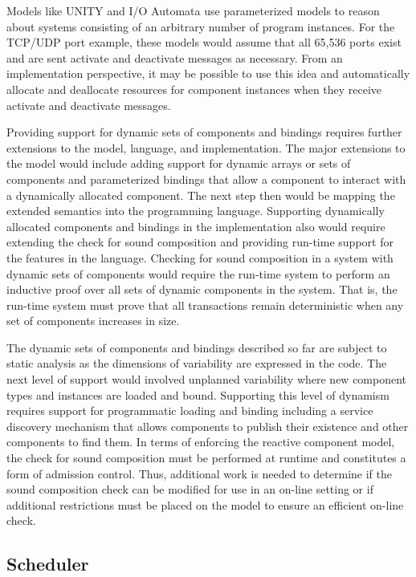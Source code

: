 Models like UNITY and I/O Automata use parameterized models to reason about systems consisting of an arbitrary number of program instances.
For the TCP/UDP port example, these models would assume that all 65,536 ports exist and are sent activate and deactivate messages as necessary.
From an implementation perspective, it may be possible to use this idea and automatically allocate and deallocate resources for component instances when they receive activate and deactivate messages.

Providing support for dynamic sets of components and bindings requires further extensions to the model, language, and implementation.
The major extensions to the model would include adding support for dynamic arrays or sets of components and parameterized bindings that allow a component to interact with a dynamically allocated component.
The next step then would be mapping the extended semantics into the \rcgo{} programming language.
Supporting dynamically allocated components and bindings in the implementation also would require extending the check for sound composition and providing run-time support for the features in the language.
Checking for sound composition in a system with dynamic sets of components would require the run-time system to perform an inductive proof over all sets of dynamic components in the system.
That is, the run-time system must prove that all transactions remain deterministic when any set of components increases in size.

The dynamic sets of components and bindings described so far are subject to static analysis as the dimensions of variability are expressed in the code.
The next level of support would involved unplanned variability where new component types and instances are loaded and bound.
Supporting this level of dynamism requires support for programmatic loading and binding including a service discovery mechanism that allows components to publish their existence and other components to find them.
In terms of enforcing the reactive component model, the check for sound composition must be performed at runtime and constitutes a form of admission control.
Thus, additional work is needed to determine if the sound composition check can be modified for use in an on-line setting or if additional restrictions must be placed on the model to ensure an efficient on-line check.

\subsection{Scheduler}
\label{future_scheduler}

